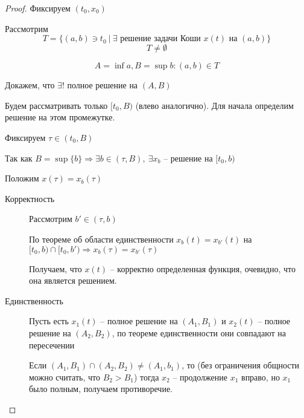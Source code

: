 \documentclass[a4paper]{article}
\theoremstyle{indented}
\theoremstyle{definition}
\theoremstyle{remark}
\begin{document}
\begin{proof}
  Фиксируем $(t_0,x_0)$
  
  Рассмотрим
  \[T = \{(a,b) \ni t_0 \ | \ \exists \text{ решение задачи Коши } x(t) \text{ на } (a,b)\}\]
  \[T \neq \emptyset\]

  \[A = \inf a, B = \sup b : (a,b) \in T\]

  Докажем, что $\exists ! $ полное решение на $(A,B)$

  Будем рассматривать только $[t_0,B)$ (влево аналогично). Для начала определим решение на этом промежутке.

  Фиксируем $\tau \in (t_0,B)$

  Так как $B = \sup\{b\} \Rightarrow \exists b \in (\tau,B), \ \exists x_b$ -- решение на $[t_0,b)$

  Положим $x(\tau) = x_b(\tau)$

  \begin{description}
  \item[Корректность] 

    Рассмотрим $b' \in (\tau,b)$

    По теореме об области единственности $ x_b(t) = x_{b'}(t)$ на $[t_0,b) \cap [t_0,b') \Rightarrow x_b(\tau) = x_{b'}(\tau)$

    Получаем, что $x(t)$ -- корректно определенная функция, очевидно, что она является решением.

    \item[Единственность]

      Пусть есть $x_1(t)$ -- полное решение  на $(A_1,B_1)$ и  $x_2(t)$ -- полное решение на $(A_2,B_2)$, по  теореме единственности они совпадают на пересечении

    Если $(A_1,B_1) \cap (A_2,B_2) \neq (A_1,b_1)$, то (без ограничения общности можно считать, что $B_2 > B_1$) тогда $x_2$ -- продолжение $x_1$ вправо, но $x_1$ было полным, получаем противоречие.
   \end{description}
\end{proof}
\end{document}
